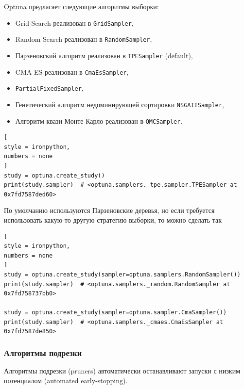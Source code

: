 \documentclass[%
	11pt,
	a4paper,
	utf8,
		]{article}
\begin{document}
Optuna предлагает следующие алгоритмы выборки:
\begin{itemize}
	\item Grid Search реализован в \verb|GridSampler|,
	
	\item Random Search реализован в \verb|RandomSampler|,
	
	\item Парзеновский алгоритм реализован в \verb|TPESampler| (default),
	
	\item CMA-ES реализован в \verb|CmaEsSampler|,
	
	\item \verb|PartialFixedSampler|,
	
	\item Генетический алгоритм недоминирующей сортировки \verb|NSGAIISampler|,
	
	\item Алгоритм квази Монте-Карло реализован в \verb|QMCSampler|.
\end{itemize}

\begin{lstlisting}[
style = ironpython,
numbers = none
]
study = optuna.create_study()
print(study.sampler)  # <optuna.samplers._tpe.sampler.TPESampler at 0x7fd7587ded60>
\end{lstlisting}

По умолчанию используются Парзеновские деревья, но если требуется использовать какую-то другую стратегию выборки, то можно сделать так
\begin{lstlisting}[
style = ironpython,
numbers = none
]
study = optuna.create_study(sampler=optuna.samplers.RandomSampler())
print(study.sampler)  # <optuna.samplers._random.RandomSampler at 0x7fd758737bb0>

study = optuna.create_study(sampler=optuna.sampler.CmaSampler())
print(study.sampler)  # <optuna.samplers._cmaes.CmaEsSampler at 0x7fd7587de850>
\end{lstlisting}

\subsubsection{Алгоритмы подрезки}

Алгоритмы подрезки (pruners) автоматически останавливают запуски с низким потенциалом (automated early-stopping).
\end{document}
